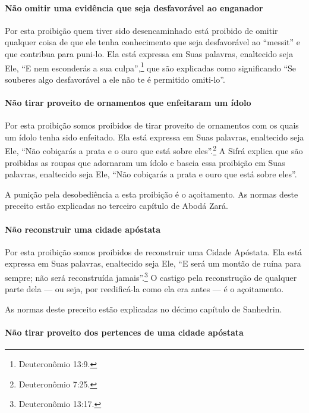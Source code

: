 \paragraph{Não omitir uma evidência que seja desfavorável ao enganador}

Por esta proibição quem tiver sido desencaminhado está proibido de
omitir qualquer coisa de que ele tenha conhecimento que seja
desfavorável ao ``messit'' e que contribua para puni-lo. Ela está expressa em Suas
palavras, enaltecido seja Ele, ``E nem esconderás a sua culpa'',\footnote{Deuteronômio 13:9.} que são explicadas como significando ``Se souberes
algo desfavorável a ele não te é permitido omiti-lo''.

\paragraph{Não tirar proveito de ornamentos que enfeitaram um ídolo}

Por esta proibição somos proibidos de tirar proveito de ornamentos com
os quais um ídolo tenha sido enfeitado. Ela está expressa em Suas
palavras, enaltecido seja Ele, ``Não cobiçarás a prata e o ouro que está
sobre eles''.\footnote{Deuteronômio 7:25.} A Sifrá explica que são proibidas as
roupas que adornaram um ídolo e baseia essa proibição em Suas palavras,
enaltecido seja Ele, ``Não cobiçarás a prata e ouro que está sobre
eles''.

A punição pela desobediência a esta proibição é o açoitamento. As normas
deste preceito estão explicadas no terceiro capítulo de Abodá Zará.

\paragraph{Não reconstruir uma cidade apóstata}

Por esta proibição somos proibidos de reconstruir uma Cidade Apóstata.
Ela está expressa em Suas palavras, enaltecido seja Ele, ``E será um
montão de ruína para sempre; não será reconstruída jamais''.\footnote{Deuteronômio 13:17.} O castigo pela reconstrução de qualquer parte dela
--- ou seja, por reedificá-la como ela era antes --- é o açoitamento.


As normas deste preceito estão explicadas no décimo capítulo de Sanhedrin.

\paragraph{Não tirar proveito dos pertences de uma cidade apóstata}

